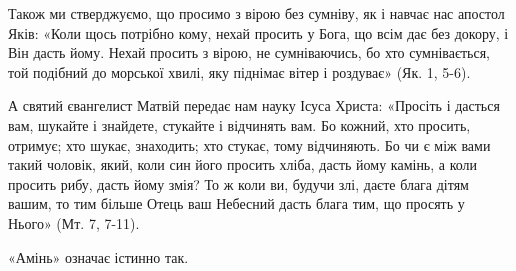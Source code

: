 \documentclass[main.tex]{subfiles}
\begin{document}
Також ми стверджуємо, що просимо з вірою без сумніву, як і навчає нас апостол Яків: «Коли щось потрібно кому, нехай просить у Бога, що всім дає без докору, і Він дасть йому. Нехай просить з вірою, не сумніваючись, бо хто сумнівається, той подібний до морської хвилі, яку піднімає вітер і роздуває» (Як. 1, 5-6).

А святий євангелист Матвій передає нам науку Ісуса Христа: «Просіть і дасться вам, шукайте і знайдете, стукайте і відчинять вам. Бо кожний, хто просить, отримує; хто шукає, знаходить; хто стукає, тому відчиняють. Бо чи є між вами такий чоловік, який, коли син його просить хліба, дасть йому камінь, а коли просить рибу, дасть йому змія? То ж коли ви, будучи злі, даєте блага дітям вашим, то тим більше Отець ваш Небесний дасть блага тим, що просять у Нього» (Мт. 7, 7-11).

«Амінь» означає істинно так.
\end{document}
